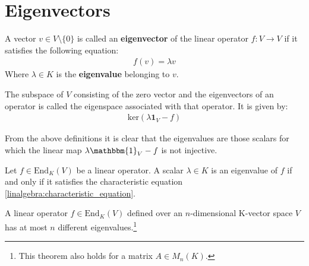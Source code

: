 \section{Eigenvectors}

    \begin{definition}[Eigenvector]
        A vector $v\in V\setminus\{0\}$ is called an \textbf{eigenvector} of the linear operator $f: V\rightarrow V$ if it satisfies the following equation:
           \begin{gather}
            f(v) = \lambda v
        \end{gather}
           Where $\lambda \in K$ is the \textbf{eigenvalue} belonging to $v$.
    \end{definition}
    \begin{definition}[Eigenspace]
        The subspace of $V$ consisting of the zero vector and the eigenvectors of an operator is called the eigenspace associated with that operator. It is given by:
            \begin{gather}
            \text{ker}(\lambda\boldsymbol{1}_V - f)
        \end{gather}
    \end{definition}
    \begin{remark}\label{linalgebra:eigenvalue_remark}
        From the above definitions it is clear that the eigenvalues are those scalars for which the linear map $\lambda\mathbbm{1}_V-f$ is not injective.
    \end{remark}

    \begin{theorem}\label{linalgebra:theorem:eigenvalue_characteristic_equation}
            Let $f\in\text{End}_K(V)$ be a linear operator. A scalar $\lambda\in K$ is an eigenvalue of $f$ if and only if it satisfies the characteristic equation \ref{linalgebra:characteristic_equation}.
    \end{theorem}

    \begin{theorem}
        A linear operator $f\in\text{End}_K(V)$ defined over an $n$-dimensional K-vector space $V$ has at most $n$ different eigenvalues.\footnote{This theorem also holds for a matrix $A\in M_n(K)$.}
    \end{theorem}

